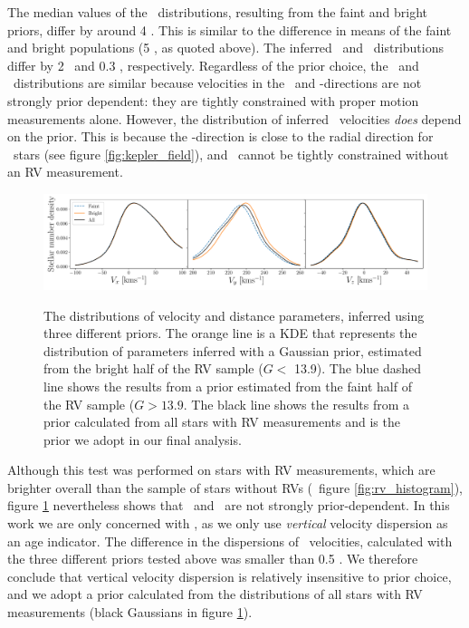 The median values of the \vy\ distributions, resulting from the faint and
bright priors, differ by around 4 \kms.
This is similar to the difference in means of the faint and bright populations
(5 \kms, as quoted above).
The inferred \vx\ and \vz\ distributions differ by 2 \kms\ and 0.3 \kms,
respectively.
Regardless of the prior choice, the \vx\ and \vz\ distributions are similar
because velocities in the \x\ and \z-directions are not strongly prior
dependent: they are tightly constrained with proper motion measurements alone.
However, the distribution of inferred \vy\ velocities {\it does} depend on the
prior.
This is because the \y-direction is close to the radial direction for \kepler\
stars (see figure \ref{fig:kepler_field}), and \vy\ cannot be tightly
constrained without an RV measurement.
\begin{figure}[ht!]
\caption{
The distributions of velocity and distance parameters, inferred using three
    different priors.
The orange line is a KDE that represents the distribution of parameters
    inferred with a Gaussian prior, estimated from the bright half of the RV
    sample ($G < $ 13.9).
The blue dashed line shows the results from a prior estimated from the faint
    half of the RV sample ($G > 13.9$.
The black line shows the results from a prior calculated from all stars with
    RV measurements and is the prior we adopt in our final analysis.
    }
  \centering
    \includegraphics[width=1\textwidth]{prior_comparison}
\label{fig:prior_comparison}
\end{figure}


Although this test was performed on stars with RV measurements, which are
brighter overall than the sample of stars without RVs (\eg\ figure
\ref{fig:rv_histogram}), figure \ref{fig:prior_comparison} nevertheless shows
that \vx\ and \vz\ are not strongly prior-dependent.
In this work we are only concerned with \vz, as we only use {\it vertical}
velocity dispersion as an age indicator.
The difference in the dispersions of \vz\ velocities, calculated with the
three different priors tested above was smaller than 0.5 \kms.
We therefore conclude that vertical velocity dispersion is relatively
insensitive to prior choice, and we adopt a prior calculated from the
distributions of all stars with RV measurements (black Gaussians in figure
\ref{fig:prior_comparison}).

